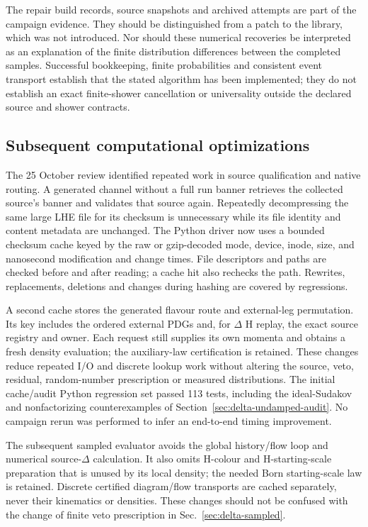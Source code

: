 The repair build records, source snapshots and archived attempts are
part of the campaign evidence.  They should be distinguished from a
patch to the \pythia{} library, which was not introduced.  Nor should
these numerical recoveries be interpreted as an explanation of the
finite distribution differences between the completed samples.
Successful bookkeeping, finite probabilities and consistent event
transport establish that the stated algorithm has been implemented;
they do not establish an exact finite-shower cancellation or
universality outside the declared source and shower contracts.

\subsection{Subsequent computational optimizations}
\label{sec:implementation-caching}
The 25 October review identified repeated work in source qualification
and native routing. A generated channel without a full run banner
retrieves the collected source's banner and validates that source again.
Repeatedly decompressing the same large LHE file for its checksum is
unnecessary while its file identity and content metadata are unchanged.
The Python driver now uses a bounded checksum cache keyed by the raw or
gzip-decoded mode, device, inode, size, and nanosecond modification and
change times. File descriptors and paths are checked before and after
reading; a cache hit also rechecks the path. Rewrites, replacements,
deletions and changes during hashing are covered by regressions.

A second cache stores the generated flavour route and external-leg
permutation. Its key includes the ordered external PDGs and, for
$\Delta$ H replay, the exact source registry and owner. Each request
still supplies its own momenta and obtains a fresh density evaluation;
the auxiliary-law certification is retained. These changes reduce
repeated I/O and discrete lookup work without altering the source,
veto, residual, random-number prescription or measured distributions.
The initial cache/audit Python regression set passed 113 tests, including
the ideal-Sudakov and nonfactorizing counterexamples of
Section~\ref{sec:delta-undamped-audit}. No campaign rerun was performed
to infer an end-to-end timing improvement.

The subsequent sampled evaluator avoids the global history/flow loop
and numerical source-$\Delta$ calculation. It also omits H-colour and
H-starting-scale preparation that is unused by its local density;
the needed Born starting-scale law is retained. Discrete certified
diagram/flow transports are cached separately, never their kinematics
or densities. These changes should not be confused with the change
of finite veto prescription in Sec.~\ref{sec:delta-sampled}.

